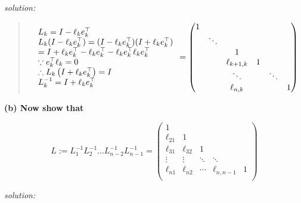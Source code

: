 \documentclass[]{article}
\begin{document}
\emph{solution:}

\begin{quote}
\[
\begin{array}{l}{L_{k}=I-\ell_{k} e_{k}^{\top}} \\ 
{L_{k} (I-\ell_{k}e_{k}^{\top})=(I-\ell_{k}e_{k}^{\top})(I+\ell_{k}e_{k}^{\top})} \\ 
{=I+\ell_{k} e_{k}^{\top}-\ell_{k} e_{k}^{\top}-\ell_{k} e_{k}^{\top} \ell_{k} e_{k}^{\top}} \\ 
{\because e_{k}^{\top} \ell_{k}=0} \\ 
{\therefore L_{k}\left(I+\ell_{k} e_{k}^{\top}\right)=I} \\ 
{L_{k}^{-1}=I+\ell_{k} e_{k}^{\top}}\end{array} \\
= \begin{pmatrix} 1 & & & & & \\
& \ddots & & & & \\
& & 1 & & & \\
& & \ell_{k+1,k} & 1 & & \\
& & \ddots & & \ddots & \\
& & \ell_{n,k} & &  & 1 
\end{pmatrix}
\]
\end{quote}

 \textbf{(b) Now show that}

\[L:= L_{1}^{-1} L_{2}^{-1} \ldots L_{n-2}^{-1} L_{n-1}^{-1} = \begin{pmatrix} 1 & & & & \\
\ell_{21} & 1 & & & \\
\ell_{31} & \ell_{32} & 1 & &  \\
\vdots & \vdots & \ddots & \ddots & \\
\ell_{n1} & \ell_{n2} & \cdots & \ell_{n,n-1} & 1    \\
\end{pmatrix}
\]

\emph{solution:}
\end{document}
